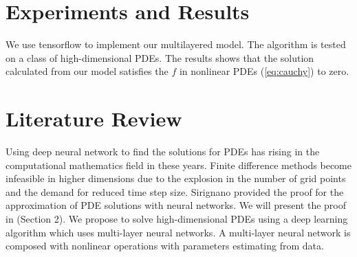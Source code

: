 \documentclass{article}
\begin{document}
\section{Experiments and Results}

We use tensorflow to implement our multilayered model. The algorithm is tested on a class of high-dimensional PDEs. The results shows that the solution calculated from our model satisfies the $f$ in nonlinear PDEs (\ref{eq:cauchy}) to zero.




\section{Literature Review}

Using deep neural network to find the solutions for PDEs has rising in the computational mathematics field in these years.  Finite difference methods become infeasible in higher dimensions due to the explosion in the number of grid points and the demand for reduced time step size. Sirignano \cite{sirignano} provided the proof for the approximation of PDE solutions with neural networks. We will present the proof in (Section 2). We propose to solve high-dimensional PDEs using a deep learning algorithm which uses multi-layer neural networks. A multi-layer neural network is composed with nonlinear operations with parameters estimating from data.




\end{document}
